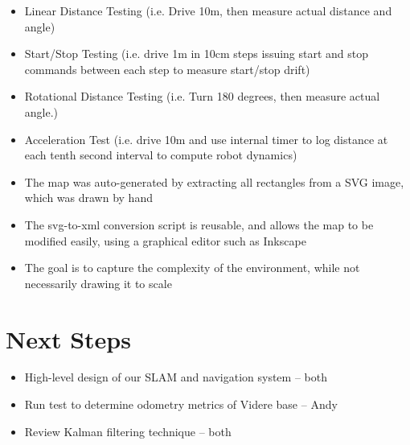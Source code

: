 \documentclass[12pt]{article}
\begin{document}
\begin{itemize}
    \setlength{\itemsep}{0pt}
    \setlength{\parskip}{0pt}
    \setlength{\parsep}{0pt}
    \item Linear Distance Testing (i.e. Drive 10m, then measure actual
      distance and angle)
    \item Start/Stop Testing (i.e. drive 1m in 10cm steps issuing
      start and stop commands between each step to measure start/stop drift)
    \item Rotational Distance Testing (i.e. Turn 180 degrees, then measure
      actual angle.)
    \item Acceleration Test (i.e. drive 10m and use internal timer to log
      distance at each tenth second interval to compute robot dynamics)
\end{itemize}

\begin{itemize}
    \setlength{\itemsep}{0pt}
    \setlength{\parskip}{0pt}
    \setlength{\parsep}{0pt}
    \item The map was auto-generated by extracting all rectangles from a SVG
          image, which was drawn by hand
    \item The svg-to-xml conversion script is reusable, and allows the map to be
          modified easily, using a graphical editor such as Inkscape
    \item The goal is to capture the complexity of the environment, while not
          necessarily drawing it to scale
\end{itemize}

\section{Next Steps}

\begin{itemize}
    \setlength{\itemsep}{0pt}
    \setlength{\parskip}{0pt}
    \setlength{\parsep}{0pt}
    \item High-level design of our SLAM and navigation system -- both
    \item Run test to determine odometry metrics of Videre base  -- Andy
    \item Review Kalman filtering technique -- both
\end{itemize}
\end{document}
